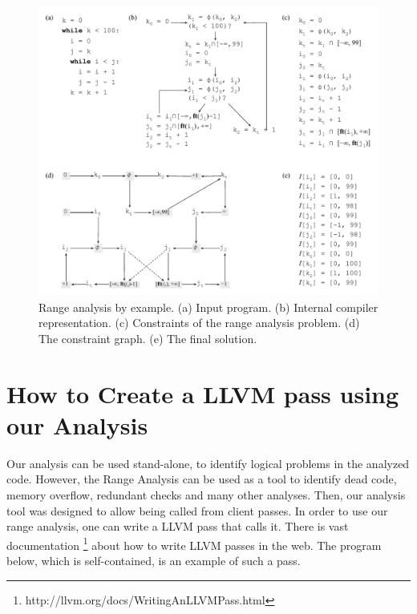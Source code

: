 \documentclass{paper}
\begin{document}
\begin{figure}[h!]
\begin{center}
\includegraphics[width=\textwidth]{images/overall_view}
\end{center}
\caption{\label{fig:overall_view}
Range analysis by example.
(a) Input program.
(b) Internal compiler representation.
(c) Constraints of the range analysis problem.
(d) The constraint graph.
(e) The final solution.}
\end{figure}

\section{How to Create a LLVM pass using our Analysis}
\label{sec:howto}

Our analysis can be used stand-alone, to identify logical problems in the analyzed code. However, the Range Analysis can be used as a tool to identify dead code, memory overflow, redundant checks and many other analyses. Then, our analysis tool was designed to allow being called from client passes.
In order to use our range analysis, one can write a LLVM pass that calls it. There is vast documentation \footnote{http://llvm.org/docs/WritingAnLLVMPass.html} about how to write LLVM passes in the web. The program below, which is self-contained, is an example of such a pass.
\end{document}
